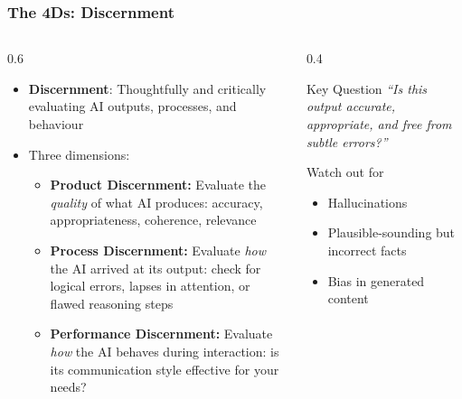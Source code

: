 \begin{frame}[fragile]\frametitle{The 4Ds: Discernment}
\begin{columns}
    \begin{column}[T]{0.6\linewidth}
      \begin{itemize}
        \item \textbf{Discernment}: Thoughtfully and critically evaluating AI outputs, processes, and behaviour
        \item Three dimensions:
          \begin{itemize}
            \item \textbf{Product Discernment:} Evaluate the \emph{quality} of what AI produces: accuracy, appropriateness, coherence, relevance
            \item \textbf{Process Discernment:} Evaluate \emph{how} the AI arrived at its output: check for logical errors, lapses in attention, or flawed reasoning steps
            \item \textbf{Performance Discernment:} Evaluate \emph{how} the AI behaves during interaction: is its communication style effective for your needs?
          \end{itemize}
      \end{itemize}
    \end{column}
    \begin{column}[T]{0.4\linewidth}
      \begin{alertblock}{Key Question}
        \emph{``Is this output accurate, appropriate, and free from subtle errors?''}
      \end{alertblock}
      \vspace{0.5em}
      \begin{exampleblock}{Watch out for}
        \begin{itemize}
          \item Hallucinations
          \item Plausible-sounding but incorrect facts
          \item Bias in generated content
        \end{itemize}
      \end{exampleblock}
    \end{column}
  \end{columns}
\end{frame}

